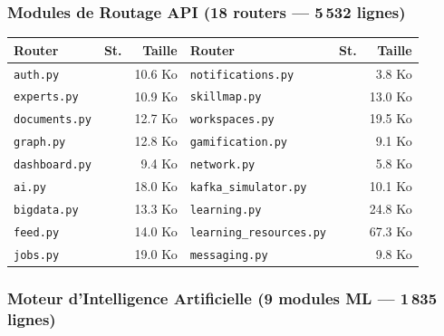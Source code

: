 \documentclass[12pt,a4paper]{article}
\newcommand{\cmark}{\textcolor{vert}{\ding{51}}}
\begin{document}
\subsubsection{Modules de Routage API (18 routers — 5\,532 lignes)}

\begin{center}
\renewcommand{\arraystretch}{1.2}
\begin{tabular}{|l|c|r||l|c|r|}
\hline
\rowcolor{bleu!15}
\textbf{Router} & \textbf{St.} & \textbf{Taille} & \textbf{Router} & \textbf{St.} & \textbf{Taille} \\
\hline
\texttt{auth.py} & \cmark & 10.6 Ko & \texttt{notifications.py} & \cmark & 3.8 Ko \\
\hline
\texttt{experts.py} & \cmark & 10.9 Ko & \texttt{skillmap.py} & \cmark & 13.0 Ko \\
\hline
\texttt{documents.py} & \cmark & 12.7 Ko & \texttt{workspaces.py} & \cmark & 19.5 Ko \\
\hline
\texttt{graph.py} & \cmark & 12.8 Ko & \texttt{gamification.py} & \cmark & 9.1 Ko \\
\hline
\texttt{dashboard.py} & \cmark & 9.4 Ko & \texttt{network.py} & \cmark & 5.8 Ko \\
\hline
\texttt{ai.py} & \cmark & 18.0 Ko & \texttt{kafka\_simulator.py} & \cmark & 10.1 Ko \\
\hline
\texttt{bigdata.py} & \cmark & 13.3 Ko & \texttt{learning.py} & \cmark & 24.8 Ko \\
\hline
\texttt{feed.py} & \cmark & 14.0 Ko & \texttt{learning\_resources.py} & \cmark & 67.3 Ko \\
\hline
\texttt{jobs.py} & \cmark & 19.0 Ko & \texttt{messaging.py} & \cmark & 9.8 Ko \\
\hline
\end{tabular}
\end{center}

\subsubsection{Moteur d'Intelligence Artificielle (9 modules ML — 1\,835 lignes)}
\end{document}
